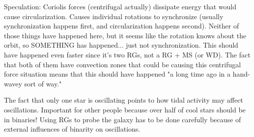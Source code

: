 Speculation:
Coriolis forces (centrifugal actually) dissipate energy that would cause circularization. Causes individual rotations to synchronize (usually synchronization happens first, and circularization happens second). Neither of those things have happened here, but it seems like the rotation knows about the orbit, so SOMETHING has happened... just not synchronization. This should have happened even faster since it's two RGs, not a RG + MS (or WD). The fact that both of them have convection zones that could be causing this centrifugal force situation means that this should have happened "a long time ago in a hand-wavey sort of way."

The fact that only one star is oscillating points to how tidal activity may affect oscillations.
Important for other people because over half of cool stars should be in binaries! Using RGs to probe the galaxy has to be done carefully because of external influences of binarity on oscillations.
    
    
    